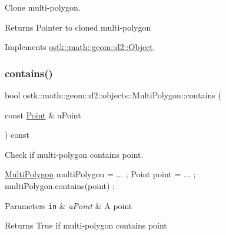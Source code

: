 Clone multi-\/polygon. 

\begin{DoxyReturn}{Returns}
Pointer to cloned multi-\/polygon 
\end{DoxyReturn}


Implements \hyperlink{classostk_1_1math_1_1geom_1_1d2_1_1_object_a98dedc6792aef35308966ca768eb3e14}{ostk\+::math\+::geom\+::d2\+::\+Object}.

\mbox{\label{classostk_1_1math_1_1geom_1_1d2_1_1objects_1_1_multi_polygon_a7b0795460707a8ee2cac31dfe7891466}} 
\subsubsection{\texorpdfstring{contains()}{contains()}\hspace{0.1cm}{\footnotesize\ttfamily [1/2]}}
{\footnotesize\ttfamily bool ostk\+::math\+::geom\+::d2\+::objects\+::\+Multi\+Polygon\+::contains (\begin{DoxyParamCaption}\item[{const \hyperlink{classostk_1_1math_1_1geom_1_1d2_1_1objects_1_1_point}{Point} \&}]{a\+Point }\end{DoxyParamCaption}) const}



Check if multi-\/polygon contains point. 


\begin{DoxyCode}
\hyperlink{classostk_1_1math_1_1geom_1_1d2_1_1objects_1_1_multi_polygon_a70327c4d3f7f19f5ae9b32c0a715f1fd}{MultiPolygon} multiPolygon = ... ;
Point point = ... ;
multiPolygon.contains(point) ;
\end{DoxyCode}



\begin{DoxyParams}[1]{Parameters}
\mbox{\tt in}  & {\em a\+Point} & A point \\
\hline
\end{DoxyParams}
\begin{DoxyReturn}{Returns}
True if multi-\/polygon contains point 
\end{DoxyReturn}
\mbox{\label{classostk_1_1math_1_1geom_1_1d2_1_1objects_1_1_multi_polygon_ad58e3e306864939951e8724bf9213d52}} 

